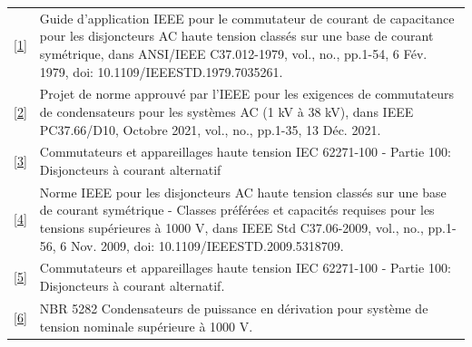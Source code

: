 \documentclass[a4paper]{article}
\begin{document}
	\noindent
	\begin{tabular}{p{0.2cm} p{15.8cm}}
		\href{https://ieeexplore.ieee.org/document/7035261}{[1]} &
		\begin{minipage}[t]{15.8cm}
			Guide d'application IEEE pour le commutateur de courant de capacitance pour les disjoncteurs AC haute tension classés sur une base de courant symétrique, dans ANSI/IEEE C37.012-1979, vol., no., pp.1-54, 6 Fév. 1979, doi: 10.1109/IEEESTD.1979.7035261.
		\end{minipage} \\
		
		\href{https://ieeexplore.ieee.org/document/9574631}{[2]} &
		\begin{minipage}[t]{15.8cm}
			Projet de norme approuvé par l'IEEE pour les exigences de commutateurs de condensateurs pour les systèmes AC (1 kV à 38 kV), dans IEEE PC37.66/D10, Octobre 2021, vol., no., pp.1-35, 13 Déc. 2021.
		\end{minipage} \\
		
		
		\href{https://webstore.iec.ch/publication/62785}{[3]} &
		\begin{minipage}[t]{15.8cm}
			Commutateurs et appareillages haute tension IEC 62271-100 - Partie 100: Disjoncteurs à courant alternatif
		\end{minipage} \\
		
		\href{https://ieeexplore.ieee.org/document/5318709}{[4]} &
		\begin{minipage}[t]{15.8cm}
			Norme IEEE pour les disjoncteurs AC haute tension classés sur une base de courant symétrique - Classes préférées et capacités requises pour les tensions supérieures à 1000 V, dans IEEE Std C37.06-2009, vol., no., pp.1-56, 6 Nov. 2009, doi: 10.1109/IEEESTD.2009.5318709.
		\end{minipage} \\
		
		\href{https://cdn.standards.iteh.ai/samples/101972/4e7e06bd66d2443da668b8e0c6c60512/IEC-62271-100-2021.pdf}{[5]} &
		\begin{minipage}[t]{15.8cm}
			Commutateurs et appareillages haute tension IEC 62271-100 - Partie 100: Disjoncteurs à courant alternatif.
		\end{minipage} \\
		
		\href{https://www.normas.com.br/autorizar/visualizacao-nbr/313/identificar/visitante}{[6]} &
		\begin{minipage}[t]{15.8cm}
			NBR 5282 Condensateurs de puissance en dérivation pour système de tension nominale supérieure à 1000 V.
		\end{minipage} \\
	\end{tabular}
	
\end{document}
